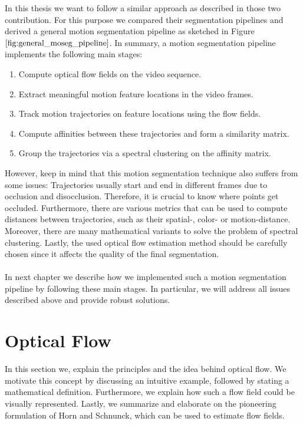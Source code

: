 In this thesis we want to follow a similar approach as described in those two contribution. For this purpose we compared their segmentation pipelines and derived a general motion segmentation pipeline as sketched in Figure $\ref{fig:general_moseg_pipeline}$. In summary, a motion segmentation pipeline implements the following main stages:
\begin{enumerate}
	\item Compute optical flow fields on the video sequence.
	\item Extract meaningful motion feature locations in the video frames.
	\item Track motion trajectories on feature locations using the flow fields.
	\item Compute affinities between these trajectories and form a similarity matrix.
	\item Group the trajectories via a spectral clustering on the affinity matrix.
\end{enumerate}
However, keep in mind that this motion segmentation technique also suffers from some issues: Trajectories usually start and end in different frames due to occlusion and disocclusion. Therefore, it is crucial to know where points get occluded. Furthermore, there are various metrics that can be used to compute distances between trajectories, such as their spatial-, color- or motion-distance. Moreover, there are many mathematical variants to solve the problem of spectral clustering. Lastly, the used optical flow estimation method should be carefully chosen since it affects the quality of the final segmentation. \\ \\
In next chapter we describe how we implemented such a motion segmentation pipeline by following these main stages. In particular, we will address all issues described above and provide robust solutions.

\section{Optical Flow}
\label{sec:optical_flow}
In this section we, explain the principles and the idea behind optical flow. We motivate this concept by discussing an intuitive example, followed by stating a mathematical definition. Furthermore, we explain how such a flow field could be visually represented. Lastly, we summarize and elaborate on the pioneering formulation of Horn and Schnunck, which can be used to estimate flow fields.


